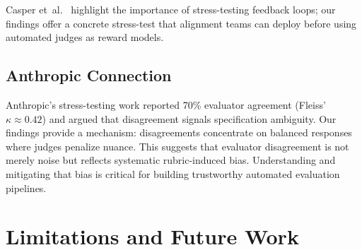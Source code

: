 \documentclass[11pt]{article}
\begin{document}
Casper et~al.~\citep{casper2023limitations} highlight the importance of stress-testing feedback loops; our findings offer a concrete stress-test that alignment teams can deploy before using automated judges as reward models.

\subsection{Anthropic Connection}
Anthropic's stress-testing work reported 70\% evaluator agreement (Fleiss' $\kappa \approx 0.42$) and argued that disagreement signals specification ambiguity. Our findings provide a mechanism: disagreements concentrate on balanced responses where judges penalize nuance. This suggests that evaluator disagreement is not merely noise but reflects systematic rubric-induced bias. Understanding and mitigating that bias is critical for building trustworthy automated evaluation pipelines.
\section{Limitations and Future Work}
\label{sec:limitations}
\end{document}
